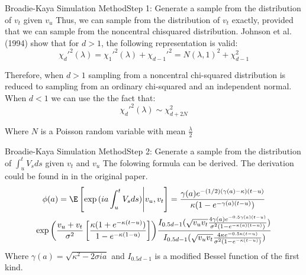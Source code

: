 \begin{frame}{Broadie-Kaya Simulation Method}{Step 1: Generate a sample from the distribution of $v_t$ given $v_u$}
    Thus, we can sample from the distribution of $v_t$ exactly,
    provided that we can sample from the noncentral chisquared distribution.
    Johnson et al. (1994) show that for $d > 1$, the following representation is valid:
    \begin{equation}
        \chi_d'^{2}(\lambda) = \chi_1'^{2}(\lambda) + \chi_{d-1}'^{2} = N(\lambda, 1)^2 + \chi_{d-1}^{2}
    \end{equation}

    Therefore,  when $d > 1$ sampling from a noncentral chi-squared distribution
    is reduced to sampling from an ordinary chi-squared and
    an independent normal.
    When $d < 1$ we can use the the fact that:
    \begin{equation}
        \chi_d'^{2}(\lambda) \sim \chi_{d + 2N}^{2}
    \end{equation}

    Where $N$ is a Poisson random variable with mean $\frac{\lambda}{2}$

    
\end{frame}

\begin{frame}{Broadie-Kaya Simulation Method}{Step 2:  Generate a sample from the distribution of $\int_{u}^t V_s ds$ given $v_t$ and $v_u$}
    The folowing formula can be derived. The derivation could be found in in the original paper.
    \begin{multline}
        \phi(a) = \E\left[  \exp{(ia\int_{u}^t V_s ds)} \Bigg| v_u, v_t\right] = \frac{\gamma(a)e^{-(1/2)(\gamma(a) - \kappa)(t - u)}}{\kappa(1-e^{-\gamma(a)(t-u)})} \\
        \exp{\left(\frac{v_u + v_t}{\sigma^2} \left[  \frac{\kappa(1+e^{-\kappa(t-u)})}{1-e^{-\kappa(1-u)}}                 \right]     \right)}
        \frac{I_{0.5d-1}(\sqrt{v_uv_t}\frac{4\gamma(a)e^{-0.5\gamma(a)(t-u)}}{\sigma^2(1-e^{-\kappa(a)(t-u)})})}{I_{0.5d-1}(\sqrt{v_uv_t}\frac{4\kappa e^{-0.5\kappa(t-u)}}{\sigma^2(1-e^{-\kappa(t-u)})})}
    \end{multline}
    Where $\gamma(a) = \sqrt{\kappa^2 - 2\sigma i a}$ and $I_{0.5d-1}$ is a modified  Bessel function of the first kind.

\end{frame}



